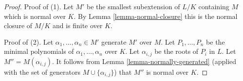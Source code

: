 \documentclass[10pt,a4paper]{amsart}
\theoremstyle{plain}
\theoremstyle{definition}
\theoremstyle{remark}
\numberwithin{equation}{subsection}
\begin{document}
\begin{proof}
Proof of (1). Let $M'$ be the smallest subextension of $L/K$ containing $M$
which is normal over $K$. By Lemma \ref{lemma-normal-closure}
this is the normal closure of $M/K$ and is finite over $K$.

\medskip\noindent
Proof of (2). Let $\alpha_1, \ldots, \alpha_n \in M'$ generate $M'$ over $M$.
Let $P_1, \ldots, P_n$ be the minimal polynomials of
$\alpha_1, \ldots, \alpha_n$ over $K$. Let $\alpha_{i, j}$ be the roots
of $P_i$ in $L$. Let $M''  = M(\alpha_{i, j})$. It follows from
Lemma \ref{lemma-normally-generated}
(applied with the set of generators $M \cup \{\alpha_{i, j}\}$)
that $M''$ is normal over $K$.
\end{proof}
\end{document}
